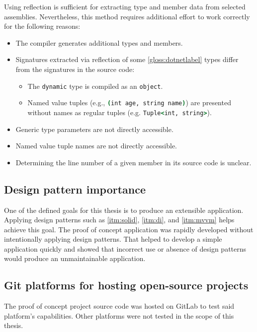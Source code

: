 Using reflection is sufficient for extracting type and member data from selected assemblies. Nevertheless, this method requires additional effort to work correctly for the following reasons:
\begin{itemize}
    \item The compiler generates additional types and members.
    \item Signatures extracted via reflection of some \ref{gloss:dotnetlabel} types differ from the signatures in the source code:
    \begin{itemize}
        \item The \lstinline[language=csh]{dynamic} type is compiled as an \lstinline[language=csh]{object}.
        \item Named value tuples (e.g., \lstinline[language=csh]{(int age, string name)}) are presented without names as regular tuples (e.g. \lstinline[language=csh]{Tuple<int, string>}).
    \end{itemize}
    \item Generic type parameters are not directly accessible.
    \item Named value tuple names are not directly accessible.
    \item Determining the line number of a given member in its source code is unclear.
\end{itemize}

\subsection{Design pattern importance}

One of the defined goals for this thesis is to produce an extensible application. Applying design patterns such as \ref{itm:solid}, \ref{itm:di}, and \ref{itm:mvvm} helps achieve this goal.
The proof of concept application was rapidly developed without intentionally applying design patterns. That helped to develop a simple application quickly and showed that incorrect use or absence of design patterns would produce an unmaintainable application.

\subsection{Git platforms for hosting open-source projects}

The proof of concept project source code was hosted on GitLab to test said platform's capabilities. Other platforms were not tested in the scope of this thesis.

